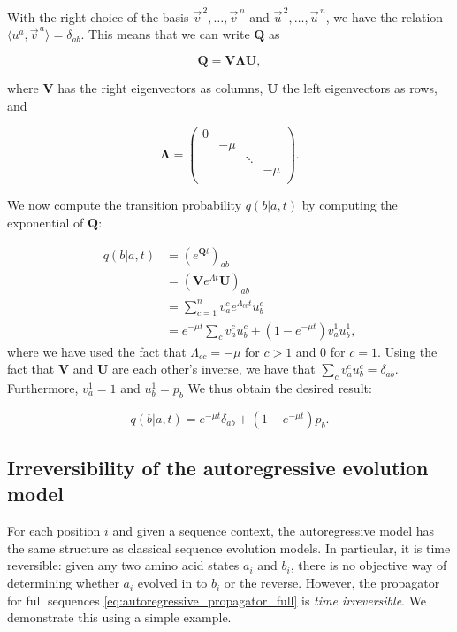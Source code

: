 With the right choice of the basis $\vec{v}^{\,2}, \ldots, \vec{v}^{\,n}$ and $\vec{u}^{\,2}, \ldots, \vec{u}^{\,n}$, we have the relation $\langle{u}^a, \vec{v}^{\,a}\rangle = \delta_{ab}$. 
This means that we can write $\mathbf{Q}$ as

$$\mathbf{Q} = \mathbf{V\Lambda U},$$

where $\mathbf{V}$ has the right eigenvectors as columns, $\mathbf{U}$ the left eigenvectors as rows, and 

$$\mathbf{\Lambda} = \begin{pmatrix}
0 & & & \\
& -\mu & & \\
& & \ddots & \\
& & & -\mu \\
\end{pmatrix}.
$$

We now compute the transition probability $q(b \vert a, t)$ by computing the exponential of $\mathbf{Q}$: 

\begin{equation}
\begin{split}
	q(b \vert a, t) &= \left(e^{\mathbf{Q}t}\right)_{ab}\\
	&= \left(\mathbf{V}e^{\Lambda t} \mathbf{U}\right)_{ab}\\
	&= \sum_{c=1}^n v_a^c e^{\Lambda_{cc}t}  u_b^c\\
	&= e^{-\mu t} \sum_c v_a^c u_b^c + (1-e^{-\mu t})v_a^1 u_b^1,
\end{split}
\end{equation}
where we have used the fact that $\Lambda_{cc} = -\mu$ for $c>1$ and $0$ for $c=1$. 
Using the fact that $\mathbf{V}$ and $\mathbf{U}$ are each other's inverse, we have that $\sum_c v_a^c u_b^c = \delta_{ab}$. 
Furthermore, $v_a^1=1$ and $u_b^1 = p_b$
We thus obtain the desired result: 

\begin{equation}
	q(b \vert a, t) = e^{-\mu t} \delta_{ab} + (1-e^{-\mu t}) p_b.
\end{equation}


\subsection{Irreversibility of the autoregressive evolution model}

For each position $i$ and given a sequence context, the autoregressive model has the same structure as classical sequence evolution models. 
In particular, it is time reversible: given any two amino acid states $a_i$ and $b_i$, there is no objective way of determining whether  $a_i$ evolved in to  $b_i$ or the reverse. 
However, the propagator for full sequences \eqref{eq:autoregressive_propagator_full} is \emph{time irreversible}. 
We demonstrate this using a simple example. 

